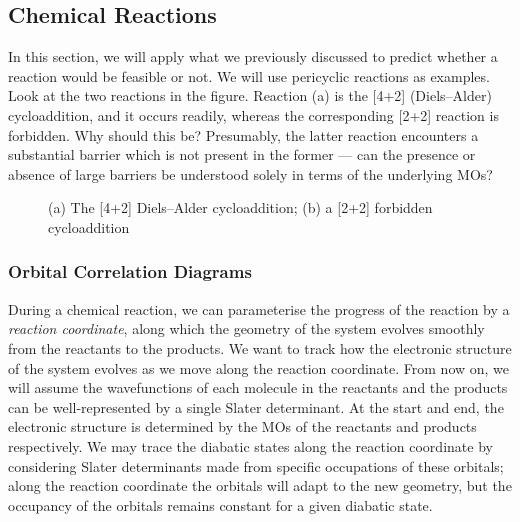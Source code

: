 \documentclass{article}
\theoremstyle{plain}\theoremheaderfont{\normalfont\itshape}\theorembodyfont{\rmfamily}\theoremseparator{.}\newtheorem*{rem}{Remark}\newtheorem*{ex}{Example}\newtheorem*{proof}{Proof}\newtheorem*{altp}{Alternative proof}
\theoremstyle{plain}\theoremheaderfont{\normalfont\bfseries}\theorembodyfont{\rmfamily}\theoremseparator{.}\newtheorem{thm}{Theorem}[section]\newtheorem{lem}[thm]{Lemma}\newtheorem{prop}[thm]{Proposition}\newtheorem*{cor}{Corollary}\newtheorem{defn}[thm]{Definition}\newtheorem{clm}[thm]{Claim}\newtheorem{clminproof}{Claim}\newtheorem{pos}{Postulate}[section]
\theoremstyle{break}\theoremheaderfont{\normalfont\itshape}\theorembodyfont{\rmfamily}\theoremseparator{.\medskip}\newtheorem*{proofskip}{Proof}\newtheorem*{exs}{Examples}\newtheorem*{rems}{Remarks}
\theoremstyle{break}\theoremheaderfont{\normalfont\bfseries}\theorembodyfont{\rmfamily}\theoremseparator{.\medskip}\newtheorem{lemskip}[thm]{Lemma}\newtheorem{defnskip}[thm]{Definition}\newtheorem{propskip}[thm]{Proposition}\newtheorem{thmskip}[thm]{Theorem}
\numberwithin{equation}{section}
\begin{document}
    \subsection{Chemical Reactions}
    In this section, we will apply what we previously discussed to predict whether a reaction would be feasible or not. We will use pericyclic reactions as examples. Look at the two reactions in the figure. Reaction (a) is the [4+2] (Diels--Alder) cycloaddition, and it occurs readily, whereas the corresponding [2+2] reaction is forbidden. Why should this be? Presumably, the latter reaction encounters a substantial barrier which is not present in the former --- can the presence or absence of large barriers be understood solely in terms of the underlying MOs?

    \begin{figure}
        \centering
        \caption{(a) The [4+2] Diels--Alder cycloaddition; (b) a [2+2] forbidden cycloaddition}
    \end{figure}

    \subsubsection{Orbital Correlation Diagrams}
    During a chemical reaction, we can parameterise the progress of the reaction by a \textit{reaction coordinate}, along which the geometry of the system evolves smoothly from the reactants to the products. We want to track how the electronic structure of the system evolves as we move along the reaction coordinate. From now on, we will assume the wavefunctions of each molecule in the reactants and the products can be well-represented by a single Slater determinant. At the start and end, the electronic structure is determined by the MOs of the reactants and products respectively. We may trace the diabatic states along the reaction coordinate by considering Slater determinants made from specific occupations of these orbitals; along the reaction coordinate the orbitals will adapt to the new geometry, but the occupancy of the orbitals remains constant for a given diabatic state.
\end{document}

